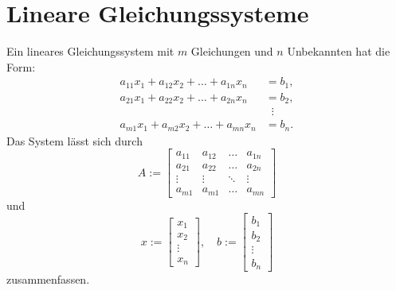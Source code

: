 \section{Lineare Gleichungssysteme}
Ein lineares Gleichungssystem mit $m$ Gleichungen und $n$ Unbekannten
hat die Form:
\begin{equation}\label{eq:LGS}
\begin{split}
a_{11} x_1 + a_{12} x_2 + \ldots + a_{1n} x_n &= b_1,\\
a_{21} x_1 + a_{22} x_2 + \ldots + a_{2n} x_n &= b_2,\\
&\;\;\vdots\\
a_{m1} x_1 + a_{m2} x_2 + \ldots + a_{mn} x_n &= b_n.
\end{split}
\end{equation}
Das System lässt sich durch
\begin{equation}
A:=\begin{bmatrix}
a_{11} & a_{12} & \ldots & a_{1n}\\
a_{21} & a_{22} & \ldots & a_{2n}\\
\vdots & \vdots & \ddots & \vdots\\
a_{m1} & a_{m1} & \ldots & a_{mn}
\end{bmatrix}
\end{equation}
und
\begin{equation}
x:=\begin{bmatrix}
x_1 \\ x_2 \\ \vdots \\ x_n
\end{bmatrix},\quad
b:=\begin{bmatrix}
b_1 \\ b_2 \\ \vdots \\ b_n
\end{bmatrix}
\end{equation}
zusammenfassen.

